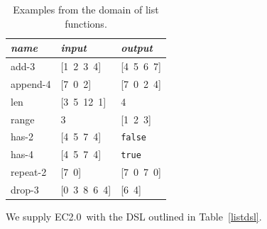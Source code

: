 \documentclass{article}
\newcommand{\system}{EC2.0~}
\begin{document}
\begin{table}
\centering
\begin{tabular}{| l | l | l |}
  \hline
  \emph{name} & \emph{input} & \emph{output} \\
  \hline
  add-3 & [1\, 2\, 3\, 4] & [4\, 5\, 6\, 7] \\
  append-4 & [7\, 0\, 2] & [7\, 0\, 2\, 4] \\
  len & [3\, 5\, 12\, 1] & 4 \\
  range & 3 & [1\, 2\, 3] \\
  has-2 & [4\, 5\, 7\, 4] & \texttt{false} \\
  has-4 & [4\, 5\, 7\, 4] & \texttt{true} \\
  repeat-2 & [7\, 0] & [7\, 0\, 7\, 0] \\
  drop-3 & [0\, 3\, 8\, 6\, 4] & [6\, 4] \\
  \hline
\end{tabular}
\caption{Examples from the domain of list functions.}
\label{listexamples}
\end{table}

We supply \system with the DSL outlined in Table~\ref{listdsl}.
\end{document}
